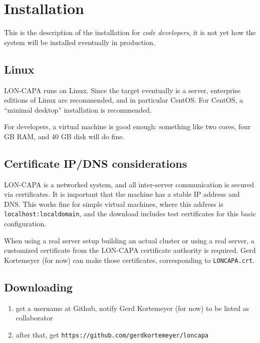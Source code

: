 \chapter{Installation}
This is the description of the installation for {\it code developers}, it is not yet how the system will be installed eventually in production.
\section{Linux}
LON-CAPA runs on Linux. Since the target eventually is a server, enterprise editions of Linux are recommended, and in particular CentOS. For CentOS, a ``minimal desktop'' installation is recommended.

For developers, a virtual machine is good enough: something like two cores, four GB RAM, and 40 GB disk will do fine.
\section{Certificate IP/DNS considerations}
LON-CAPA is a networked system, and all inter-server communication is secured via certificates. It is important that the machine has a stable IP address and DNS. This works fine for simple virtual machines, where this address is {\tt localhost:localdomain}, and the download includes test certificates for this basic configuration.

When using a real server setup building an actual cluster or using a real server, a customized certificate from the LON-CAPA certificate authority is required. Gerd Kortemeyer (for now) can make those certificates, corresponding to {\tt LONCAPA.crt}.
\section{Downloading}
\begin{enumerate}
\item get a username at Github, notify Gerd Kortemeyer (for now) to be listed as collaborator
\item after that, get {\tt https://github.com/gerdkortemeyer/loncapa}
\end{enumerate}
